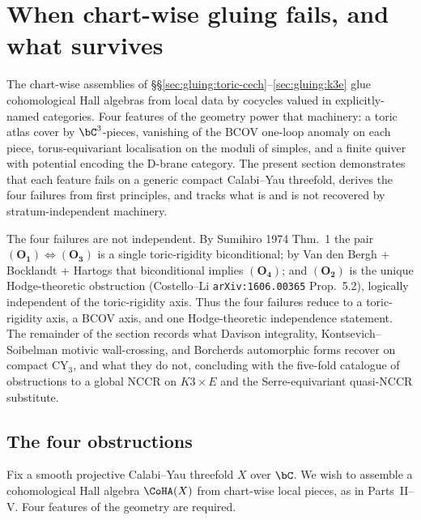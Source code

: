 \section{When chart-wise gluing fails, and what survives}
\label{sec:gluing:obstructions}

The chart-wise assemblies of \S\S\ref{sec:gluing:toric-cech}--\ref{sec:gluing:k3e} glue cohomological Hall algebras from local data by cocycles valued in explicitly-named categories. Four features of the geometry power that machinery: a toric atlas cover by $\bC^3$-pieces, vanishing of the BCOV one-loop anomaly on each piece, torus-equivariant localisation on the moduli of simples, and a finite quiver with potential encoding the D-brane category. The present section demonstrates that each feature fails on a generic compact Calabi--Yau threefold, derives the four failures from first principles, and tracks what is and is not recovered by stratum-independent machinery.

The four failures are not independent. By Sumihiro 1974 Thm.~1 the pair $(\mathbf{O_1}) \Leftrightarrow (\mathbf{O_3})$ is a single toric-rigidity biconditional; by Van den Bergh + Bocklandt + Hartogs that biconditional implies $(\mathbf{O_4})$; and $(\mathbf{O_2})$ is the unique Hodge-theoretic obstruction (Costello--Li \texttt{arXiv:1606.00365} Prop.~5.2), logically independent of the toric-rigidity axis. Thus the four failures reduce to a toric-rigidity axis, a BCOV axis, and one Hodge-theoretic independence statement. The remainder of the section records what Davison integrality, Kontsevich--Soibelman motivic wall-crossing, and Borcherds automorphic forms recover on compact CY$_3$, and what they do not, concluding with the five-fold catalogue of obstructions to a global NCCR on $K3\times E$ and the Serre-equivariant quasi-NCCR substitute.
\subsection{The four obstructions}
\label{sec:four-obstructions}

Fix a smooth projective Calabi--Yau threefold $X$ over $\bC$. We wish
to assemble a cohomological Hall algebra $\CoHA(X)$ from chart-wise
local pieces, as in Parts~II--V. Four features of the geometry are
required.

